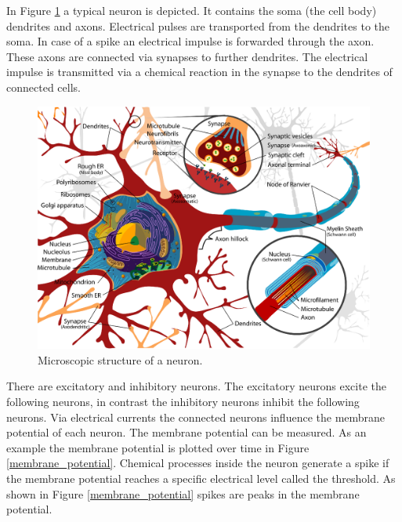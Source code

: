 \documentclass[a4paper]{article}
\begin{document}
  In Figure \ref{Corticalneurons} a typical neuron is depicted.
  It contains the soma (the cell body) dendrites and axons.
  Electrical pulses are transported from the dendrites to the soma.
  In case of a spike an electrical impulse is forwarded through the axon.
  These axons are connected via synapses to further dendrites.
  The electrical impulse is transmitted via a chemical reaction in the synapse to the dendrites of connected cells.
  \begin{figure}[!htbp]
    \centering
    \includegraphics[scale=0.65]{Complete_neuron_cell_diagram_en.eps}
    \caption{Microscopic structure of a neuron. \cite{neuronpic}}
    \label{Corticalneurons}
  \end{figure}
  There are excitatory and inhibitory neurons.
  The excitatory neurons excite the following neurons, 
  in contrast the inhibitory neurons inhibit the following neurons.
  Via electrical currents the connected neurons influence the membrane potential of each neuron.
  The membrane potential can be measured.
  As an example the membrane potential is plotted over time in Figure \ref{membrane_potential}.
  Chemical processes inside the neuron generate a spike if the membrane potential reaches a specific electrical level called the threshold.  
  As shown in Figure \ref{membrane_potential} spikes are peaks in the membrane potential.  
  
  
\end{document}

